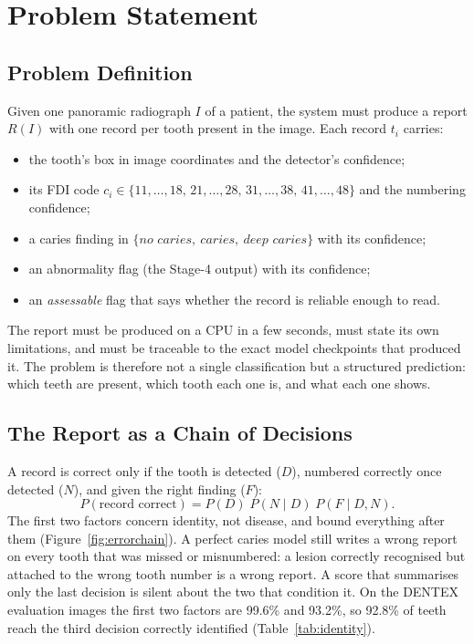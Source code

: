 \chapter{Problem Statement}
\label{ch:problem}

\section{Problem Definition}

Given one panoramic radiograph $I$ of a patient, the system must produce a report $R(I)$ with one
record per tooth present in the image. Each record $t_i$ carries:
\begin{itemize}
\item the tooth's box in image coordinates and the detector's confidence;
\item its FDI code $c_i \in \{11,\dots,18,\,21,\dots,28,\,31,\dots,38,\,41,\dots,48\}$ and the
  numbering confidence;
\item a caries finding in $\{\textit{no caries},\ \textit{caries},\ \textit{deep caries}\}$ with its
  confidence;
\item an abnormality flag (the Stage-4 output) with its confidence;
\item an \emph{assessable} flag that says whether the record is reliable enough to read.
\end{itemize}
The report must be produced on a CPU in a few seconds, must state its own limitations, and must be
traceable to the exact model checkpoints that produced it. The problem is therefore not a single
classification but a structured prediction: which teeth are present, which tooth each one is, and
what each one shows.

\section{The Report as a Chain of Decisions}

A record is correct only if the tooth is detected ($D$), numbered correctly once detected ($N$), and
given the right finding ($F$):
\begin{equation}
P(\text{record correct}) = P(D)\;P(N \mid D)\;P(F \mid D, N).
\label{eq:chain}
\end{equation}
The first two factors concern identity, not disease, and bound everything after them
(Figure~\ref{fig:errorchain}). A perfect caries model still writes a wrong report on every tooth that
was missed or misnumbered: a lesion correctly recognised but attached to the wrong tooth number is a
wrong report. A score that summarises only the last decision is silent about the two that condition
it. On the DENTEX evaluation images the first two factors are 99.6\% and 93.2\%, so 92.8\% of teeth
reach the third decision correctly identified (Table~\ref{tab:identity}). %

